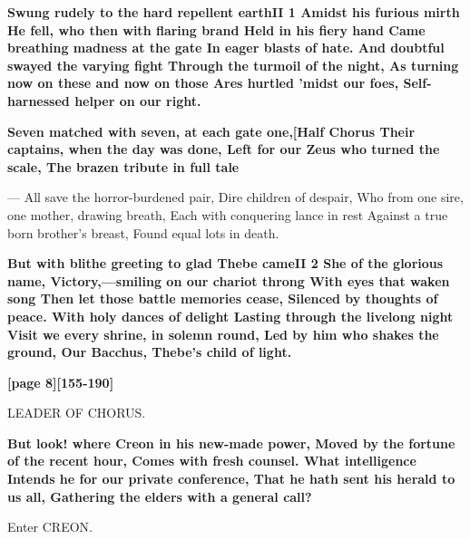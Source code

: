 \documentclass[11pt,letter]{book}
\begin{document}
\par \textbf{Swung rudely to the hard repellent earthII 1 Amidst his furious mirth He fell, who then with flaring brand Held in his fiery hand Came breathing madness at the gate In eager blasts of hate. And doubtful swayed the varying fight Through the turmoil of the night, As turning now on these and now on those Ares hurtled ’midst our foes, Self-harnessed helper on our right.}
\par 

\par \textbf{Seven matched with seven, at each gate one,[Half Chorus Their captains, when the day was done, Left for our Zeus who turned the scale, The brazen tribute in full tale}
\par  — All save the horror-burdened pair, Dire children of despair, Who from one sire, one mother, drawing breath, Each with conquering lance in rest Against a true born brother’s breast, Found equal lots in death.

\par \textbf{But with blithe greeting to glad Thebe cameII 2 She of the glorious name, Victory,—smiling on our chariot throng With eyes that waken song Then let those battle memories cease, Silenced by thoughts of peace. With holy dances of delight Lasting through the livelong night Visit we every shrine, in solemn round, Led by him who shakes the ground, Our Bacchus, Thebe’s child of light.}
\par 

\par \textbf{[page 8][155-190]}
\par 

\par  LEADER OF CHORUS.

\par \textbf{But look! where Creon in his new-made power, Moved by the fortune of the recent hour, Comes with fresh counsel. What intelligence Intends he for our private conference, That he hath sent his herald to us all, Gathering the elders with a general call?}
\par 

\par  Enter CREON.
\end{document}
